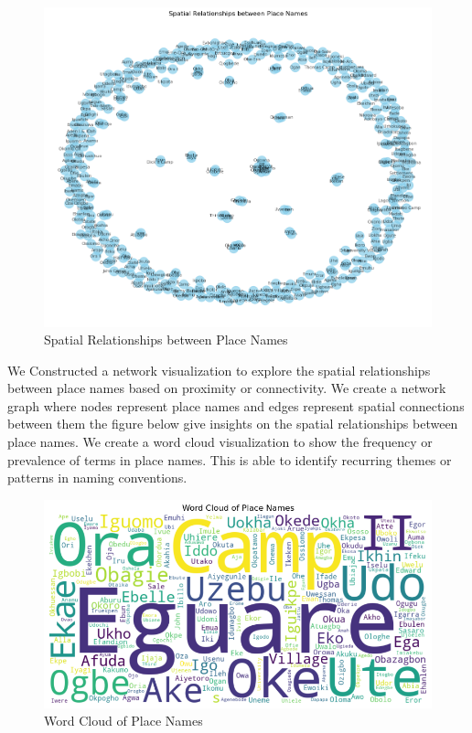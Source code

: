 \begin{figure}
    \centering
    \includegraphics[width=1\linewidth]{networkanalysis.png}
    \caption{Spatial Relationships between Place Names}
    \label{fig:network}
\end{figure}
We Constructed a network visualization to explore the spatial relationships between place names based on proximity or connectivity. We create a network graph where nodes represent place names and edges represent spatial connections between them the figure below give insights on the spatial relationships between place names.
\newpage
We create a word cloud visualization to show the frequency or prevalence of terms in place names. This is able to identify recurring themes or patterns in naming conventions.
\begin{figure}
    \centering
    \includegraphics[width=1\linewidth]{wordcloud.png}
    \caption{Word Cloud of Place Names}
    \label{fig:wordcloud}
\end{figure}